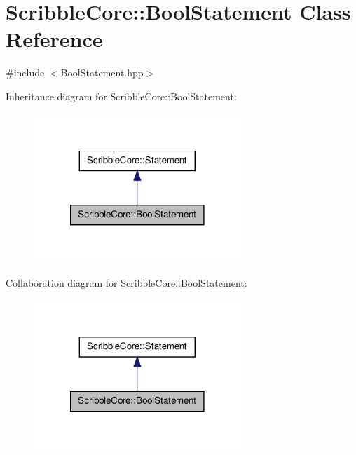 \hypertarget{class_scribble_core_1_1_bool_statement}{\section{Scribble\-Core\-:\-:Bool\-Statement Class Reference}
\label{class_scribble_core_1_1_bool_statement}
}


{\ttfamily \#include $<$Bool\-Statement.\-hpp$>$}



Inheritance diagram for Scribble\-Core\-:\-:Bool\-Statement\-:\nopagebreak
\begin{figure}[H]
\begin{center}
\leavevmode
\includegraphics[width=222pt]{class_scribble_core_1_1_bool_statement__inherit__graph}
\end{center}
\end{figure}


Collaboration diagram for Scribble\-Core\-:\-:Bool\-Statement\-:\nopagebreak
\begin{figure}[H]
\begin{center}
\leavevmode
\includegraphics[width=222pt]{class_scribble_core_1_1_bool_statement__coll__graph}
\end{center}
\end{figure}
